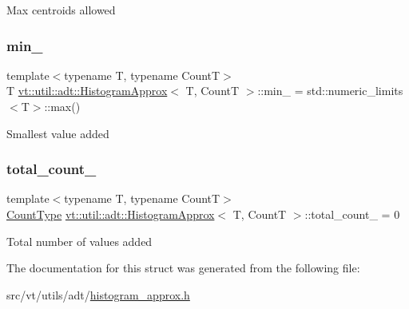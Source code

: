 Max centroids allowed \mbox{\label{structvt_1_1util_1_1adt_1_1_histogram_approx_a0cf82abced8b354d01757093e4510d46}} 
\subsubsection{\texorpdfstring{min\+\_\+}{min\_}}
{\footnotesize\ttfamily template$<$typename T, typename CountT$>$ \\
T \hyperlink{structvt_1_1util_1_1adt_1_1_histogram_approx}{vt\+::util\+::adt\+::\+Histogram\+Approx}$<$ T, CountT $>$\+::min\+\_\+ = std\+::numeric\+\_\+limits$<$T$>$\+::max()\hspace{0.3cm}{\ttfamily [private]}}

Smallest value added \mbox{\label{structvt_1_1util_1_1adt_1_1_histogram_approx_aad876385bbf54051a56e736ef403f7a9}} 
\subsubsection{\texorpdfstring{total\+\_\+count\+\_\+}{total\_count\_}}
{\footnotesize\ttfamily template$<$typename T, typename CountT$>$ \\
\hyperlink{structvt_1_1util_1_1adt_1_1_histogram_approx_aa2fb74665588d311da76dd821f2912c6}{Count\+Type} \hyperlink{structvt_1_1util_1_1adt_1_1_histogram_approx}{vt\+::util\+::adt\+::\+Histogram\+Approx}$<$ T, CountT $>$\+::total\+\_\+count\+\_\+ = 0\hspace{0.3cm}{\ttfamily [private]}}

Total number of values added 

The documentation for this struct was generated from the following file\+:\begin{DoxyCompactItemize}
\item 
src/vt/utils/adt/\hyperlink{histogram__approx_8h}{histogram\+\_\+approx.\+h}\end{DoxyCompactItemize}
